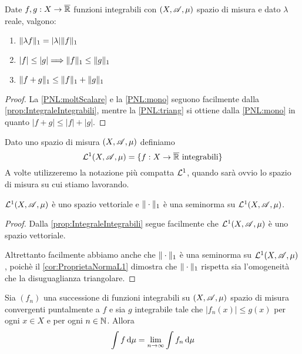 \begin{corollary}\label{cor:ProprietaNormaL1}
	Date $f,g:X\to\overline{\mathbb R}$ funzioni integrabili con $(X,\mathscr A,\mu)$ spazio di misura e dato $\lambda$ reale, valgono:
	\begin{enumerate}
		\item $\Vert \lambda f\Vert_1=|\lambda|\Vert f\Vert_1$ \label{PNL:moltScalare}
		\item $|f|\le |g|\Longrightarrow \Vert f\Vert_1\le \Vert g\Vert_1$ \label{PNL:mono}
		\item $\Vert f+g\Vert_1\le\Vert f\Vert_1+\Vert g\Vert_1$ \label{PNL:triang}
	\end{enumerate}
\end{corollary}
\begin{proof}
	La \ref{PNL:moltScalare} e la \ref{PNL:mono} seguono facilmente dalla \cref{prop:IntegraleIntegrabili}, mentre la \ref{PNL:triang} si ottiene dalla \ref{PNL:mono} in quanto $|f+g|\le|f|+|g|$.
\end{proof}



\begin{definition}
	Dato uno spazio di misura $(X,\mathscr A,\mu)$ definiamo
	\begin{equation*}
		\mathcal L^1(X,\mathscr A,\mu)=\{ f:X\to\overline{\mathbb R} \text{ integrabili} \}
	\end{equation*}
	A volte utilizzeremo la notazione più compatta $\mathcal L^1$, quando sarà ovvio lo spazio di misura su cui stiamo lavorando.
\end{definition}

\begin{proposition}\label{prop:L1VettorialeConSeminorma}
	$\mathcal L^1(X,\mathscr A,\mu)$ è uno spazio vettoriale e $\Vert \cdot\Vert_1$ è una seminorma su $\mathcal L^1(X,\mathscr A,\mu)$.
\end{proposition}
\begin{proof}
	Dalla \cref{prop:IntegraleIntegrabili} segue facilmente che $\mathcal L^1(X,\mathscr A,\mu)$ è uno spazio vettoriale. 
	
	Altrettanto facilmente abbiamo anche che $\Vert \cdot\Vert_1$ è una seminorma su $\mathcal L^1(X,\mathscr A,\mu)$, poichè il \cref{cor:ProprietaNormaL1} dimostra che $\Vert \cdot\Vert_1$ rispetta sia l'omogeneità che la disuguaglianza triangolare.
\end{proof}

\begin{theorem}\label{thm:ConvergenzaDominata}
	Sia $(f_n)$ una successione di funzioni integrabili su $(X,\mathscr A,\mu)$ spazio di misura convergenti puntalmente a $f$ e sia $g$ integrabile tale che $|f_n(x)|\le g(x)$ per ogni $x\in X$ e per ogni $n\in\mathbb N$. Allora
	\begin{equation*}
		\int f \,\mathrm d\mu=\lim_{n\to\infty}\int f_n\,\mathrm d\mu
	\end{equation*}
\end{theorem}

